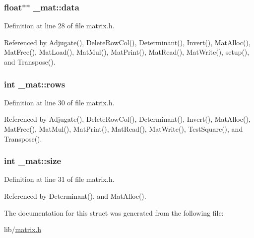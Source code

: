 \subsubsection[{\texorpdfstring{data}{data}}]{\setlength{\rightskip}{0pt plus 5cm}float$\ast$$\ast$ \+\_\+mat\+::data}\hypertarget{struct__mat_a00dcd82a8de11b7f16f7edfde55bcfae}{}\label{struct__mat_a00dcd82a8de11b7f16f7edfde55bcfae}


Definition at line 28 of file matrix.\+h.



Referenced by Adjugate(), Delete\+Row\+Col(), Determinant(), Invert(), Mat\+Alloc(), Mat\+Free(), Mat\+Load(), Mat\+Mul(), Mat\+Print(), Mat\+Read(), Mat\+Write(), setup(), and Transpose().

\subsubsection[{\texorpdfstring{rows}{rows}}]{\setlength{\rightskip}{0pt plus 5cm}int \+\_\+mat\+::rows}\hypertarget{struct__mat_a5e6bcb8b0c0239ca9b782c48b0b3c98a}{}\label{struct__mat_a5e6bcb8b0c0239ca9b782c48b0b3c98a}


Definition at line 30 of file matrix.\+h.



Referenced by Adjugate(), Delete\+Row\+Col(), Determinant(), Invert(), Mat\+Alloc(), Mat\+Free(), Mat\+Mul(), Mat\+Print(), Mat\+Read(), Mat\+Write(), Test\+Square(), and Transpose().

\subsubsection[{\texorpdfstring{size}{size}}]{\setlength{\rightskip}{0pt plus 5cm}int \+\_\+mat\+::size}\hypertarget{struct__mat_ab54203ad7b60fc23832cb3b2a863857f}{}\label{struct__mat_ab54203ad7b60fc23832cb3b2a863857f}


Definition at line 31 of file matrix.\+h.



Referenced by Determinant(), and Mat\+Alloc().



The documentation for this struct was generated from the following file\+:\begin{DoxyCompactItemize}
\item 
lib/\hyperlink{matrix_8h}{matrix.\+h}\end{DoxyCompactItemize}

